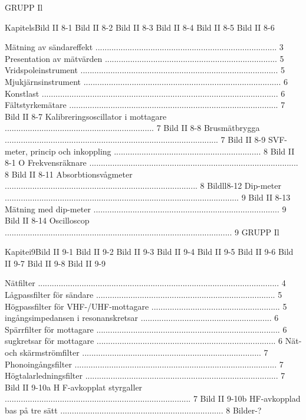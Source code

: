 \documentclass[a4paper,twoside,twocolumn,openright]{book}
\begin{document}
{{{{{{{{{{{GRUPP Il

KapitelsBild II 8-1
Bild II 8-2
Bild II 8-3
Bild II 8-4
Bild II 8-5
Bild II 8-6

Mätning av sändareffekt ............................................................................... 3
Presentation av mätvärden ........................................................................... 5
Vridspoleinstrument ...................................................................................... 5
Mjukjärnsinstrument ...................................................................................... 6
Konstlast ....................................................................................................... 6
Fältstyrkemätare ........................................................................................... 7
Bild II 8-7
Kalibreringsoscillator i mottagare ................................................................. 7
Bild II 8-8
Brusmätbrygga ............................................................................................. 7
Bild II 8-9
SVF-meter, princip och inkoppling ................................................................ 8
Bild II 8-1 O Frekvensräknare ........................................................................................... 8
Bild II 8-11
Absorbtionsvågmeter .................................................................................... 8
Bildll8-12 Dip-meter ...................................................................................................... 9
Bild II 8-13 Mätning med dip-meter ................................................................................. 9
Bild II 8-14 Oscilloscop ................................................................................................... 9
GRUPP Il

Kapitei9Bild II 9-1
Bild II 9-2
Bild II 9-3
Bild II 9-4
Bild II 9-5
Bild II 9-6
Bild II 9-7
Bild II 9-8
Bild II 9-9

Nätfilter ......................................................................................................... 4
Lågpassfilter för sändare .............................................................................. 5
Högpassfilter för VHF-/UHF-mottagare ........................................................ 5
ingångsimpedansen i resonanskretsar ......................................................... 6
Spärrfilter för mottagare ................................................................................ 6
sugkretsar för mottagare .............................................................................. 6
Nät- och skärmströmfilter .............................................................................. 7
Phonoingångsfilter ........................................................................................ 7
Högtalarledningsfilter .................................................................................... 7
Bild II 9-10a H F-avkopplat styrgaller ................................................................................. 7
Bild II 9-10b HF-avkopplad bas på tre sätt ....................................................................... 8
Bilder-?

}}}}}}}}}}}
\end{document}
